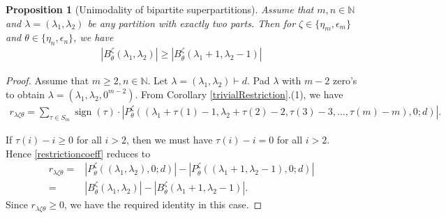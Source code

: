 \documentclass[12pt,reqno]{amsart}
\newtheorem{proposition}[theorem]{Proposition}
\theoremstyle{definition}
\theoremstyle{remark}
\DeclareMathOperator{\sign}{sign}
\begin{document}
\begin{proposition}[Unimodality of bipartite superpartitions]\label{unimodalitySuperPartitions}Assume that $m,n\in\mathbb{N}$ and $\lambda=(\lambda_{1},\lambda_{2})$ be any partition with exactly two parts. Then for $\zeta\in\{\eta_m ,\epsilon_m\}$ and $\theta\in\{\eta_n ,\epsilon_n\}$, we have
\begin{align}\label{unimodality}
    |B^{\zeta}_{\theta}(\lambda_{1},\lambda_{2})|\geq |B^{\zeta}_{\theta}(\lambda_{1}+1,\lambda_{2}-1)|
\end{align}   
\end{proposition}
\begin{proof}
Assume that $m\geq 2, n\in\mathbb{N}$. Let $\lambda=(\lambda_{1},\lambda_{2})\vdash d$. Pad $\lambda$ with $m-2$ zero's to obtain $\lambda=(\lambda_{1},\lambda_{2},0^{m-2})$. From Corollary \ref{trivialRestriction}.(1), we have
\begin{multline}\label{restrictioncoeff}r_{\lambda\zeta\theta}=\sum_{\tau\in S_{m}}\sign(\tau)\cdot|P^{\zeta}_{\theta}((\lambda_{1}+\tau(1)-1,\lambda_{2}+\tau(2)-2,\tau(3)-3,\dotsc,\tau(m)-m),0;d)|.
\end{multline}

If $\tau(i)-i\geq 0$ for all $i>2$, then we must have $\tau(i)-i= 0$ for all $i>2$. Hence \eqref{restrictioncoeff} reduces to
\begin{align*}
    r_{\lambda\zeta\theta}=&|P^{\zeta}_{\theta}((\lambda_{1},\lambda_{2}),0;d)|-|P^{\zeta}_{\theta}((\lambda_{1}+1,\lambda_{2}-1),0;d)|\\
    =&|B^{\zeta}_{\theta}(\lambda_{1},\lambda_{2})|-|B^{\zeta}_{\theta}(\lambda_{1}+1,\lambda_{2}-1)|.
\end{align*}
Since $r_{\lambda\zeta\theta}\geq 0$, we have the required identity in this case.


\end{proof}
\end{document}
